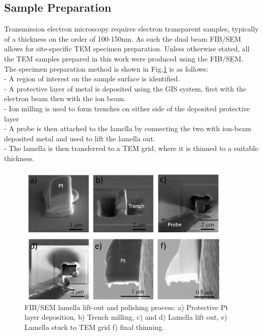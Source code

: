 \subsection{Sample Preparation}
Transmission electron microscopy  requires electron transparent samples, typically of a thickness on the order of 100-150nm. As such the dual beam FIB/SEM allows for site-specific TEM specimen preparation. Unless otherwise stated, all the TEM samples prepared in this work were produced using the FIB/SEM.\\
The specimen preparation method is shown in Fig.\ref{2.9} is as follows:\\
\indent - A region of interest on the sample surface is identified.\\
\indent - A protective layer of metal is deposited using the GIS system, first with the electron beam then with the ion beam.\\
\indent - Ion milling is used to form trenches on either side of the deposited protective layer\\
\indent - A probe is then attached to the lamella by connecting the two with ion-beam deposited metal and used to lift the lamella out.\\
\indent - The lamella is then transferred to a TEM grid, where it is thinned to a suitable thickness.

\begin{figure}[!ht]
	\centering
	\includegraphics[width=0.9\textwidth]{Figs/Ch2/liftout.png}
	\caption[h] {FIB/SEM lamella lift-out and polishing process: a) Protective Pt layer deposition, b) Trench milling, c) and d) Lamella lift out, e) Lamella stuck to TEM grid f) final thinning.}
	\label{2.9}
\end{figure}
\FloatBarrier

